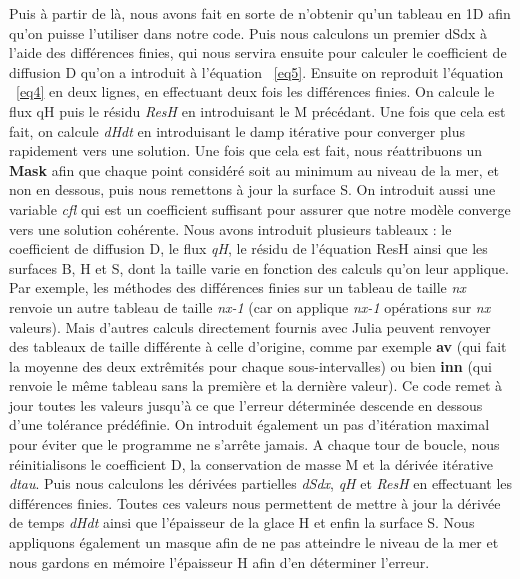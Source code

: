 \documentclass{article}
\begin{document}
\newpage
Puis à partir de là, nous avons fait en sorte de n'obtenir qu'un tableau en 1D afin qu'on puisse l'utiliser dans notre code. Puis nous calculons un premier dSdx à l'aide des différences finies, qui nous servira ensuite pour calculer le coefficient de diffusion D qu'on a introduit à l'équation ~\eqref{eq5}. Ensuite on reproduit l'équation ~\eqref{eq4} en deux lignes, en effectuant deux fois les différences finies. On calcule le flux qH puis le résidu \textit{ResH} en introduisant le M précédant. Une fois que cela est fait, on calcule \textit{dHdt} en introduisant le damp itérative pour converger plus rapidement vers une solution. Une fois que cela est fait, nous réattribuons un \textbf{Mask} afin que chaque point considéré soit au minimum au niveau de la mer, et non en dessous, puis nous remettons à jour la surface S. On introduit aussi une variable \textit{cfl} qui est un coefficient suffisant pour assurer que notre modèle converge vers une solution cohérente.
\newline
\newline
Nous avons introduit plusieurs tableaux : le coefficient de diffusion D, le flux \textit{qH}, le résidu de l'équation ResH ainsi que les surfaces B, H et S, dont la taille varie en fonction des calculs qu'on leur applique. Par exemple, les méthodes des différences finies sur un tableau de taille \textit{nx} renvoie un autre tableau de taille \textit{nx-1} (car on applique \textit{nx-1} opérations sur \textit{nx} valeurs). Mais d'autres calculs directement fournis avec Julia peuvent renvoyer des tableaux de taille différente à celle d'origine, comme par exemple \textbf{av} (qui fait la moyenne des deux extrêmités pour chaque sous-intervalles) ou bien \textbf{inn} (qui renvoie le même tableau sans la première et la dernière valeur).
\newline
\newline
Ce code remet à jour toutes les valeurs jusqu'à ce que l'erreur déterminée descende en dessous d'une tolérance prédéfinie. On introduit également un pas d'itération maximal pour éviter que le programme ne s'arrête jamais.
\newline
\newline
A chaque tour de boucle, nous réinitialisons le coefficient D, la conservation de masse M et la dérivée itérative \textit{dtau}. Puis nous calculons les dérivées partielles \textit{dSdx}, \textit{qH} et \textit{ResH} en effectuant les différences finies. Toutes ces valeurs nous permettent de mettre à jour la dérivée de temps \textit{dHdt} ainsi que l'épaisseur de la glace H et enfin la surface S. Nous appliquons également un masque afin de ne pas atteindre le niveau de la mer et nous gardons en mémoire l'épaisseur H afin d'en déterminer l'erreur.
\end{document}
